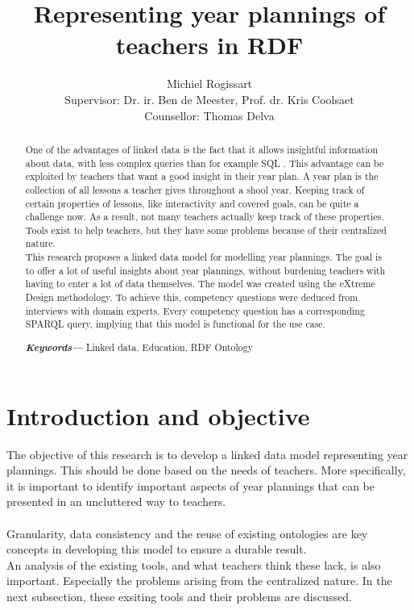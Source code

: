 \documentclass[12pt,journal]{IEEEtran}
\providecommand{\keywords}[1]
{
  \small	
  \textbf{\textit{Keywords---}} #1
}
\begin{document}
\pagestyle{empty}
\title{Representing year plannings of teachers in RDF}
\author{Michiel Rogissart\\[12pt]
	\large Supervisor: Dr. ir. Ben de Meester, Prof. dr. Kris Coolsaet \\
	Counsellor: Thomas Delva}
\maketitle


\setcounter{page}{3}
\thispagestyle{plain}
\pagestyle{plain}
\begin{abstract}
One of the advantages of linked data is the fact that it allows insightful information about data, with less complex queries than for example SQL \cite{sqlvsqparql}.
This advantage can be exploited by teachers that want a good insight in their year plan. A year plan is the collection of all lessons a teacher gives throughout a shool year.
Keeping track of certain properties of lessons, like interactivity and covered goals, can be quite a challenge now.
As a result, not many teachers actually keep track of these properties.
Tools exist to help teachers, but they have some problems because of their centralized nature.\\
This research proposes a linked data model for modelling year plannings. The goal is to offer a lot of useful insights about year plannings, without burdening teachers with having to enter a lot of data themselves.
The model was created using the eXtreme Design methodology\cite{xd}. To achieve this, competency questions were deduced from interviews with domain experts.
Every competency question has a corresponding SPARQL query, implying that this model is functional for the use case.
\keywords{Linked data, Education, RDF Ontology}
\end{abstract}

\section{Introduction and objective}

\noindent The objective of this research is to develop a linked data model representing year plannings. This should be done based on the needs of teachers.
More specifically, it is important to identify important aspects of year plannings that can be presented in an uncluttered way to teachers. \\ \\
Granularity, data consistency and the reuse of existing ontologies are key concepts in developing this model to ensure a durable result.\\
An analysis of the existing tools, and what teachers think these lack, is also important. Especially the problems arising from the centralized nature.
In the next subsection, these exsiting tools and their problems are discussed.
\end{document}
